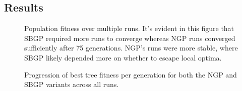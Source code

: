 \documentclass{article}
\begin{document}
\subsection{Results}
\begin{figure}[H]
  \caption{Population fitness over multiple runs. It's evident in this figure that SBGP required more runs to converge whereas NGP runs converged sufficiently after 75 generations. NGP's runs were more stable, where SBGP likely depended more on whether to escape local optima.}
  \label{gpPopResults}
\end{figure}

\begin{figure}[H]
  \caption{Progression of best tree fitness per generation for both the NGP and SBGP variants across all runs.}
  \label{gpBestResults}
\end{figure}
\end{document}
